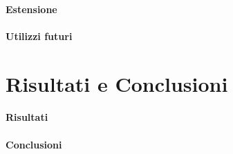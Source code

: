 \documentclass[a4paper,11pt, oneside]{article}
\begin{document}
            \subsection{Estensione}
            \subsection{Utilizzi futuri}
            
    \part{Risultati e Conclusioni}
        \subsection{Risultati}
        \subsection{Conclusioni}
\end{document}
